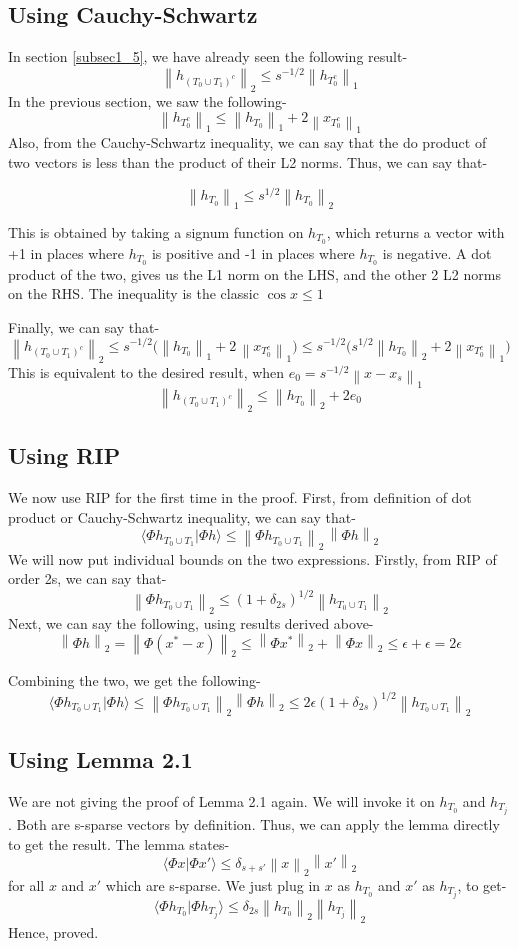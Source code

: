 \documentclass[a4paper,11pt]{article}
\numberwithin{definition}{section}
\numberwithin{mytheorem}{subsection}
\newcommand\norm[1]{\left\lVert#1\right\rVert}
\begin{document}
\subsection{Using Cauchy-Schwartz}
\label{cauchy}
In section \ref{subsec1_5}, we have already seen the following result-
$$\norm{h_{(T_0 \cup T_1)^c}}_2 \leq s^{-1/2} \norm{h_{T_0^c}}_1$$
In the previous section, we saw the following-
$$ \norm{h_{T_0^c}}_1 \leq \norm{h_{T_0}}_1 + 2\norm{x_{T_0^c}}_1$$
Also, from the Cauchy-Schwartz inequality, we can say that the do product of two vectors is less than the product of their L2 norms. Thus, we can say that-

$$\norm{h_{T_0}}_1 \leq s^{1/2}\norm{h_{T_0}}_2$$

This is obtained by taking a signum function on $h_{T_0}$, which returns a vector with +1 in places where $h_{T_0}$ is positive and -1 in places where $h_{T_0}$ is negative. A dot product of the two, gives us the L1 norm on the LHS, and the other 2 L2 norms on the RHS. The inequality is the classic $\cos{x} \leq 1$

Finally, we can say that-
$$\norm{h_{(T_0 \cup T_1)^c}}_2 \leq s^{-1/2} \bigg(\norm{h_{T_0}}_1 + 2\,\norm{x_{T_0^c}}_1\bigg) \leq s^{-1/2} \bigg(s^{1/2} \norm{h_{T_0}}_2 + 2\norm{x_{T_0^c}}_1\bigg)$$
This is equivalent to the desired result, when $e_0 = s^{-1/2}\norm{x - x_s}_1$
$$\norm{h_{(T_0 \cup T_1)^c}}_2 \leq \norm{h_{T_0}}_2 + 2e_0$$

\subsection{Using RIP}
\label{rip}
We now use RIP for the first time in the proof. First, from definition of dot product or Cauchy-Schwartz inequality, we can say that-
$$\langle \Phi h_{T_0 \cup T_1}| \Phi h\rangle \leq \norm{\Phi h_{T_0 \cup T_1}}_2 \, \norm{\Phi h}_2$$
We will now put individual bounds on the two expressions.
Firstly, from RIP of order 2s, we can say that-
$$\norm{\Phi h_{T_0 \cup T_1}}_2 \leq (1 + \delta_{2s})^{1/2} \norm{ h_{T_0 \cup T_1}}_2$$
Next, we can say the following, using results derived above-
$$\norm{\Phi h}_2 = \norm{\Phi (x^* - x)}_2 \leq \norm{\Phi x^*}_2 + \norm{\Phi x}_2 \leq \epsilon + \epsilon = 2\epsilon$$

Combining the two, we get the following-
$$\langle \Phi h_{T_0 \cup T_1}| \Phi h\rangle \leq \norm{\Phi h_{T_0 \cup T_1}}_2 \norm{\Phi h}_2 \leq 2\epsilon(1 + \delta_{2s})^{1/2} \norm{ h_{T_0 \cup T_1}}_2 $$


\subsection{Using Lemma 2.1}
\label{lemma}
We are not giving the proof of Lemma 2.1 again. We will invoke it on $h_{T_0}$ and $h_{T_j}$. Both are s-sparse vectors by definition. Thus, we can apply the lemma directly to get the result. The lemma states-
$$\langle \Phi x| \Phi x' \rangle \leq \delta_{s + s'} \norm{x}_2 \norm{x'}_2$$
for all $x$ and $x'$ which are s-sparse.
We just plug in $x$ as $h_{T_0}$ and $x'$ as $h_{T_j}$, to get-
$$\langle \Phi h_{T_0}| \Phi h_{T_j}\rangle \leq \delta_{2s}\norm{h_{T_0}}_2 \norm{h_{T_j}}_2$$
Hence, proved.
\end{document}
